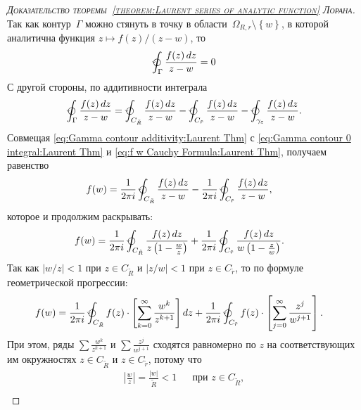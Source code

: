 \documentclass[../complex-analysis.tex]{subfiles}
\begin{document}
\begin{proof}[\normalfont\textsc{Доказательство теоремы~\ref{theorem:Laurent series of analytic function} Лорана}]
 Так как контур~$ \Gamma $ можно стянуть в точку в области~$ \Omega_{R,r} \setminus \left\{ w \right\} $, в которой аналитична функция $ z \mapsto f(z) / (z - w) $, то
 \begin{align}
  \label{eq:Gamma contour 0 integral:Laurent Thm}
  \varointctrclockwise_{\Gamma} \frac{f(z)\,dz}{z - w}  = 0
 \end{align} С другой стороны, по аддитивности интеграла
 \begin{align}
  \label{eq:Gamma contour additivity:Laurent Thm}
  \varointctrclockwise_{\Gamma} \frac{f(z)\,dz}{z-w} = \varointctrclockwise_{C_{\tilde R}} \frac{f(z)\,dz}{z-w} - \varointctrclockwise_{C_{\tilde r}} \frac{f(z)\,dz}{z-w}  - \varointctrclockwise_{\gamma_\eps} \frac{f(z)\,dz}{z-w}.
 \end{align} Совмещая \eqref{eq:Gamma contour additivity:Laurent Thm} с \eqref{eq:Gamma contour 0 integral:Laurent Thm} и \eqref{eq:f w Cauchy Formula:Laurent Thm}, получаем равенство
 \begin{align*}
  f(w) &= \frac{1}{2\pi i} \varointctrclockwise_{C_{\tilde R}} \frac{f(z)\,dz}{z-w} - \frac{1}{2\pi i} \varointctrclockwise_{C_{\tilde r}} \frac{f(z)\,dz}{z-w},
 \end{align*} которое и продолжим раскрывать:
 \begin{align*}
  f(w) &= \frac{1}{2\pi i} \varointctrclockwise_{C_{\tilde R}} \frac{f(z)\,dz}{z \left( 1 - \frac{w}{z} \right)} + \frac{1}{2\pi i} \varointctrclockwise_{C_{\tilde r}} \frac{f(z)\,dz}{w \left( 1 - \frac{z}{w} \right)}.
 \end{align*} Так как $ \left| w / z \right| < 1 $ при $ z \in C_{\tilde R} $ и $ \left| z / w \right| < 1 $ при $ z \in C_{\tilde r} $, то по формуле геометрической прогрессии:
 \begin{align*}
  f(w) &= \frac{1}{2\pi i} \varointctrclockwise_{C_{\tilde R}} f(z) \cdot \left[ \sum_{k=0}^{\infty} \frac{w^{k}}{z^{k+1}} \right]dz + \frac{1}{2\pi i} \varointctrclockwise_{C_{\tilde r}} f(z) \cdot \left[ \sum_{j=0}^{\infty} \frac{z^{j}}{w^{j+1}} \right].
 \end{align*} При этом, ряды $ \sum \frac{w^{k}}{z^{k+1}} $ и $ \sum \frac{z^{j}}{w^{j + 1}} $ сходятся равномерно по $ z $ на соответствующих им окружностях $ z \in C_{\tilde R} $ и $ z \in C_{\tilde r} $, потому что
 \begin{align}
  \label{eq:Bound Geom Progression C_R:Laurent Thm} \left| \frac{w}{z} \right| =  \frac{\left| w \right|}{\tilde R} < 1 &&\text{при } z\in C_{\tilde R},\\

\end{align}
\end{proof}
\end{document}
